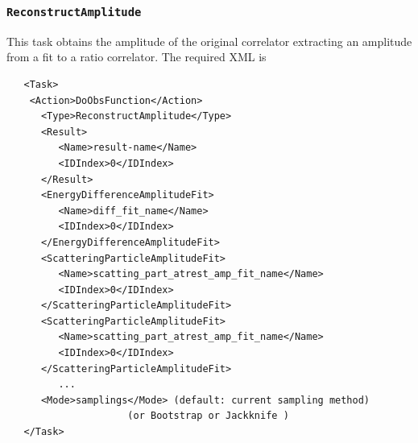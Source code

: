 \documentclass[12pt]{article}
\newcommand{\vb}{\texttt}
\begin{document}
\subsubsection{\vb{ReconstructAmplitude}}
This task obtains the amplitude of the original correlator extracting
an amplitude from a fit to a ratio correlator.  The required XML is
\begin{verbatim} 
   <Task>                                                       
    <Action>DoObsFunction</Action>                              
      <Type>ReconstructAmplitude</Type>                         
      <Result>                                                  
         <Name>result-name</Name>                               
         <IDIndex>0</IDIndex>                                   
      </Result>                                                 
      <EnergyDifferenceAmplitudeFit>                            
         <Name>diff_fit_name</Name>                             
         <IDIndex>0</IDIndex>                                   
      </EnergyDifferenceAmplitudeFit>                           
      <ScatteringParticleAmplitudeFit>                          
         <Name>scatting_part_atrest_amp_fit_name</Name>         
         <IDIndex>0</IDIndex>                                   
      </ScatteringParticleAmplitudeFit>                         
      <ScatteringParticleAmplitudeFit>                          
         <Name>scatting_part_atrest_amp_fit_name</Name>         
         <IDIndex>0</IDIndex>                                   
      </ScatteringParticleAmplitudeFit>                         
         ...                                                    
      <Mode>samplings</Mode> (default: current sampling method) 
                     (or Bootstrap or Jackknife )               
   </Task>                                                      
\end{verbatim}
\end{document}
